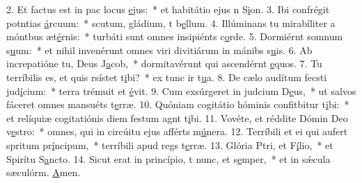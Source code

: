2. Et factus est in pac locus \uline{e}jus:~* et habitátio ejus n S\uline{i}on.
3. Ibi confrégit potntias \uline{á}rcuum:~* scutum, gládium, t b\uline{e}llum.
4. Illúminans tu mirabíliter a móntbus æt\uline{é}rnis:~* turbáti sunt omnes insipiénts c\uline{o}rde.
5. Dormiérnt somnum s\uline{u}um:~* et nihil invenérunt omnes viri divitiárum in mánibs s\uline{u}is.
6. Ab increpatióne tu, Deus J\uline{a}cob,~* dormitavérunt qui ascendérnt \uline{e}quos.
7. Tu terríbilis es, et quis rsístet t\uline{i}bi?~* ex tunc ir t\uline{u}a.
8. De cælo audítum fecsti jud\uline{í}cium:~* terra trémuit et \uline{é}vit.
9. Cum exsúrgeret in judcium D\uline{e}us,~* ut salvos fáceret omnes mansuéts t\uline{e}rræ.
10. Quóniam cogitátio hóminis confitbitur t\uline{i}bi:~* et relíquiæ cogitatiónis diem festum agnt t\uline{i}bi.
11. Vovéte, et réddite Dómin Deo v\uline{e}stro:~* omnes, qui in circúitu ejus afférts m\uline{ú}nera.
12. Terríbili et ei qui aufert spritum pr\uline{í}ncipum,~* terríbili apud regs t\uline{e}rræ.
13. Glória Ptri, et F\uline{í}lio,~* et Spirítu S\uline{a}ncto.
14. Sicut erat in princípio, t nunc, et s\uline{e}mper,~* et in sǽcula sæculórm. \uline{A}men.
